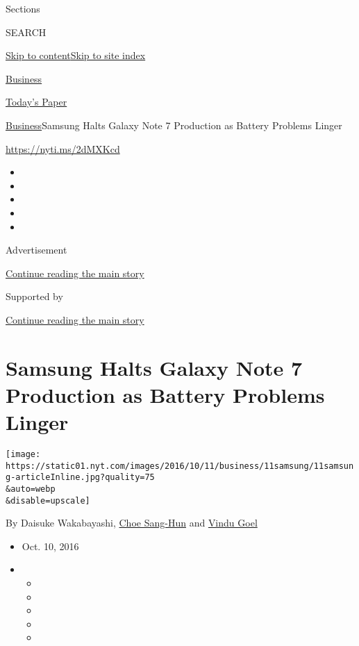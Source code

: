 Sections

SEARCH

\protect\hyperlink{site-content}{Skip to
content}\protect\hyperlink{site-index}{Skip to site index}

\href{https://www.nytimes.com/section/business}{Business}

\href{https://myaccount.nytimes.com/auth/login?response_type=cookie\&client_id=vi}{}

\href{https://www.nytimes.com/section/todayspaper}{Today's Paper}

\href{/section/business}{Business}\textbar{}Samsung Halts Galaxy Note 7
Production as Battery Problems Linger

\url{https://nyti.ms/2dMXKcd}

\begin{itemize}
\item
\item
\item
\item
\item
\end{itemize}

Advertisement

\protect\hyperlink{after-top}{Continue reading the main story}

Supported by

\protect\hyperlink{after-sponsor}{Continue reading the main story}

\hypertarget{samsung-halts-galaxy-note-7-production-as-battery-problems-linger}{%
\section{Samsung Halts Galaxy Note 7 Production as Battery Problems
Linger}\label{samsung-halts-galaxy-note-7-production-as-battery-problems-linger}}

\texttt{[image: https://static01.nyt.com/images/2016/10/11/business/11samsung/11samsung-articleInline.jpg?quality=75\\\&auto=webp\\\&disable=upscale]}

By Daisuke Wakabayashi,
\href{http://www.nytimes.com/by/choe-sang-hun}{Choe Sang-Hun} and
\href{http://www.nytimes.com/by/vindu-goel}{Vindu Goel}

\begin{itemize}
\item
  Oct. 10, 2016
\item
  \begin{itemize}
  \item
  \item
  \item
  \item
  \item
  \end{itemize}
\end{itemize}


